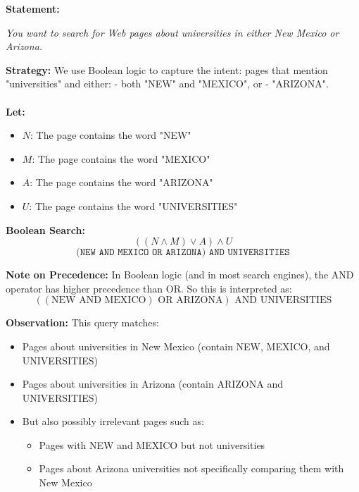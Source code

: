 \begin{tcolorbox}[title=Example 2: Boolean Searching with OR and AND Precedence]
\textbf{Statement:}  
\begin{center}
\textit{You want to search for Web pages about universities in either New Mexico or Arizona.}
\end{center}

\textbf{Strategy:}  
We use Boolean logic to capture the intent: pages that mention "universities" and either:
- both "NEW" and "MEXICO", or
- "ARIZONA".
\\ \\
\textbf{Let:}
\begin{itemize}\setlength\itemsep{0em}
    \item $N$: The page contains the word "NEW"
    \item $M$: The page contains the word "MEXICO"
    \item $A$: The page contains the word "ARIZONA"
    \item $U$: The page contains the word "UNIVERSITIES"
\end{itemize}

\textbf{Boolean Search:}
\[
((N \land M) \lor A) \land U
\]
\[
\texttt{(NEW AND MEXICO OR ARIZONA) AND UNIVERSITIES}
\]

\textbf{Note on Precedence:}  
In Boolean logic (and in most search engines), the AND operator has higher precedence than OR.  
So this is interpreted as:
\[
((\text{NEW AND MEXICO}) \text{ OR ARIZONA}) \text{ AND UNIVERSITIES}
\]

\textbf{Observation:}  
This query matches:
\begin{itemize}\setlength\itemsep{0em}
    \item Pages about universities in New Mexico (contain NEW, MEXICO, and UNIVERSITIES)
    \item Pages about universities in Arizona (contain ARIZONA and UNIVERSITIES)
    \item But also possibly irrelevant pages such as:
    \begin{itemize}\setlength\itemsep{0em}
        \item Pages with NEW and MEXICO but not universities
        \item Pages about Arizona universities not specifically comparing them with New Mexico
    \end{itemize}
\end{itemize}

\vspace{0.5em}


\end{tcolorbox}
